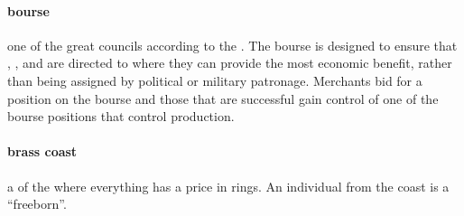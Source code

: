 \paragraph{bourse} one of the great councils according to the . The bourse is designed to ensure that , ,  and  are directed to where they can provide the most economic benefit, rather than being assigned by political or military patronage. Merchants bid for a position on the bourse and those that are successful gain control of one of the bourse positions that control production.
\paragraph{brass coast} a  of the  where everything has a price in rings. An individual from the coast is a “freeborn”.
